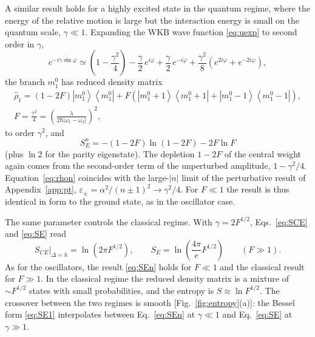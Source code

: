 \documentclass[aps,preprint,12pt,superscriptaddress,nofootinbib]{revtex4-2}
\newcommand{\ketbra}[2]{\left|#1\right\rangle\!\left\langle#2\right|}
\begin{document}
A similar result holds for a highly excited state in the quantum regime, where the
energy of the relative motion is large but the interaction energy is small on the
quantum scale, $\gamma\ll1$. Expanding the WKB wave function \eqref{eq:uexp} to
second order in $\gamma$,
\begin{equation}
e^{-i\gamma\sin\varphi}\simeq\left(1-\frac{\gamma^{2}}{4}\right)
-\frac{\gamma}{2}\,e^{i\varphi}+\frac{\gamma}{2}\,e^{-i\varphi}
+\frac{\gamma^{2}}{8}\left(e^{2i\varphi}+e^{-2i\varphi}\right),
\label{eq:smallgamma}
\end{equation}
the branch $m_{1}^{0}$ has reduced density matrix
\begin{equation}
\begin{gathered}
\hat\rho_{1}=(1-2F)\ketbra{m_{1}^{0}}{m_{1}^{0}}
+F\left(\ketbra{m_{1}^{0}+1}{m_{1}^{0}+1}+\ketbra{m_{1}^{0}-1}{m_{1}^{0}-1}\right),\\
F=\frac{\gamma^{2}}{4}=\left(\frac{\lambda}{2\hbar|\omega_{1}-\omega_{2}|}\right)^{2},
\end{gathered}
\label{eq:rhon}
\end{equation}
to order $\gamma^{2}$, and
\begin{equation}
S^{n}_{E}=-(1-2F)\ln(1-2F)-2F\ln F
\label{eq:SEn}
\end{equation}
(plus $\ln2$ for the parity eigenstate). The depletion $1-2F$ of the central weight
again comes from the second-order term of the unperturbed amplitude,
$1-\gamma^{2}/4$. Equation~\eqref{eq:rhon} coincides with the large-$|n|$ limit of
the perturbative result of Appendix~\ref{app:pt}, $\varepsilon_{\pm}=\alpha^{2}/(n\pm1)^{2}
\to\gamma^{2}/4$. For $F\ll1$ the result is thus identical in form to the ground
state, as in the oscillator case.

The same parameter controls the classical regime. With $\gamma=2F^{1/2}$,
Eqs.~\eqref{eq:SCE} and \eqref{eq:SE} read
\begin{equation}
S_{CE}\big|_{\Delta=h}=\ln\left(2\pi F^{1/2}\right),\qquad
S_{E}=\ln\left(\frac{4\pi}{e}F^{1/2}\right)\qquad(F\gg1).
\label{eq:Sclassreg}
\end{equation}
As for the oscillators, the result \eqref{eq:SEn} holds for $F\ll1$ and the classical
result for $F\gg1$. In the classical regime the reduced density matrix is a mixture
of $\sim F^{1/2}$ states with small probabilities, and the entropy is
$S\approx\ln F^{1/2}$. The crossover between the two regimes is smooth
[Fig.~\ref{fig:entropy}(a)]: the Bessel form \eqref{eq:SE1} interpolates between
Eq.~\eqref{eq:SEn} at $\gamma\ll1$ and Eq.~\eqref{eq:SE} at $\gamma\gg1$.
\end{document}
